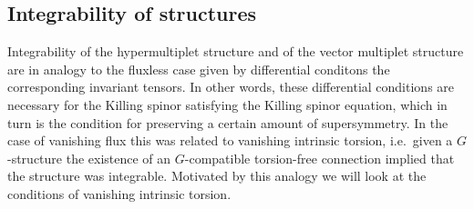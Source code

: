 


\subsection{Integrability of structures}

Integrability of the hypermultiplet structure and of the vector multiplet structure are in analogy to the fluxless case given by differential conditons the corresponding invariant tensors. In other words, these differential conditions are necessary for the Killing spinor satisfying the Killing spinor equation, which in turn is the condition for preserving a certain amount of supersymmetry. In the case of vanishing flux this was related to vanishing intrinsic torsion, i.e.\ given a $G$-structure the existence of an $G$-compatible torsion-free connection implied that the structure was integrable. Motivated by this analogy we will look at the conditions of vanishing intrinsic torsion.

